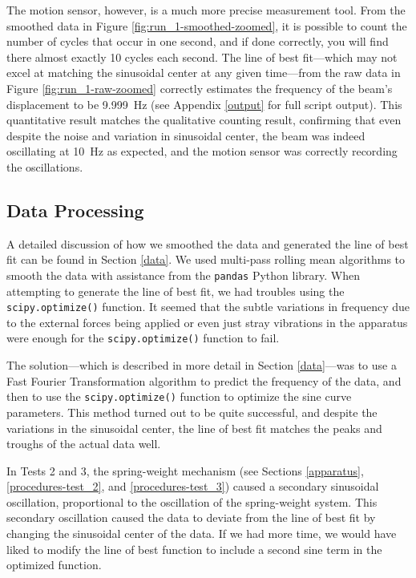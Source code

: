 \documentclass[12 pt]{report}
\begin{document}
The motion sensor, however, is a much more precise measurement tool. From the smoothed data in Figure \ref{fig:run_1-smoothed-zoomed}, it is possible to count the number of cycles that occur in one second, and if done correctly, you will find there almost exactly \num{10} cycles each second. The line of best fit---which may not excel at matching the sinusoidal center at any given time---from the raw data in Figure \ref{fig:run_1-raw-zoomed} correctly estimates the frequency of the beam's displacement to be \qty{9.999}{\hertz} (see Appendix \ref{output} for full script output). This quantitative result matches the qualitative counting result, confirming that even despite the noise and variation in sinusoidal center, the beam was indeed oscillating at \qty{10}{\hertz} as expected, and the motion sensor was correctly recording the oscillations.

\subsection{Data Processing} \label{analysis-data_processing}
A detailed discussion of how we smoothed the data and generated the line of best fit can be found in Section \ref{data}. We used multi-pass rolling mean algorithms to smooth the data with assistance from the \texttt{pandas} Python library. When attempting to generate the line of best fit, we had troubles using the \texttt{scipy.optimize()} function. It seemed that the subtle variations in frequency due to the external forces being applied or even just stray vibrations in the apparatus were enough for the \texttt{scipy.optimize()} function to fail.

The solution---which is described in more detail in Section \ref{data}---was to use a Fast Fourier Transformation algorithm to predict the frequency of the data, and then to use the \texttt{scipy.{\allowbreak}optimize()} function to optimize the sine curve parameters. This method turned out to be quite successful, and despite the variations in the sinusoidal center, the line of best fit matches the peaks and troughs of the actual data well.

In Tests \num{2} and \num{3}, the spring-weight mechanism (see Sections \ref{apparatus}, \ref{procedures-test_2}, and \ref{procedures-test_3}) caused a secondary sinusoidal oscillation, proportional to the oscillation of the spring-weight system. This secondary oscillation caused the data to deviate from the line of best fit by changing the sinusoidal center of the data. If we had more time, we would have liked to modify the line of best function to include a second sine term in the optimized function.
\end{document}
